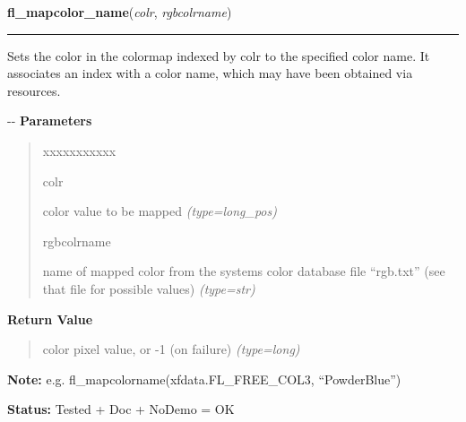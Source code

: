     \label{xformslib:flbasic:fl_mapcolorname}

    \vspace{0.5ex}

\hspace{.8\funcindent}\begin{boxedminipage}{\funcwidth}

    \raggedright \textbf{fl\_mapcolor\_name}(\textit{colr}, \textit{rgbcolrname})

    \vspace{-1.5ex}

    \rule{\textwidth}{0.5\fboxrule}
\setlength{\parskip}{2ex}

Sets the color in the colormap indexed by colr to the specified color
name. It associates an index with a color name, which may have been
obtained via resources.

-{}-
\setlength{\parskip}{1ex}
      \textbf{Parameters}
      \vspace{-1ex}

      \begin{quote}
        \begin{Ventry}{xxxxxxxxxxx}

          \item[colr]


color value to be mapped
            {\it (type=long\_pos)}

          \item[rgbcolrname]


name of mapped color from the systems color database file ``rgb.txt''
(see that file for possible values)
            {\it (type=str)}

        \end{Ventry}

      \end{quote}

      \textbf{Return Value}
    \vspace{-1ex}

      \begin{quote}

color pixel value, or -1 (on failure)
      {\it (type=long)}

      \end{quote}

\textbf{Note:} 
e.g. fl\_mapcolorname(xfdata.FL\_FREE\_COL3, ``PowderBlue'')


\textbf{Status:} 
Tested + Doc + NoDemo = OK


    \end{boxedminipage}


